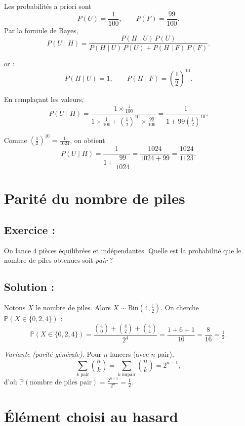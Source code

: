 Les probabilités a priori sont
\[
P(U) = \frac{1}{100}, \qquad
P(F) = \frac{99}{100}.
\]
Par la formule de Bayes,
\[
P(U \mid H)
= \frac{P(H \mid U)\,P(U)}
       {P(H \mid U)\,P(U) + P(H \mid F)\,P(F)}.
\]


or  :
\[
P(H \mid U) = 1,
\qquad
P(H \mid F) = \left(\frac{1}{2}\right)^{10}.
\]


En remplaçant les valeurs,
\[
P(U \mid H)
= \frac{1 \times \tfrac{1}{100}}
       {1 \times \tfrac{1}{100} + \left(\tfrac{1}{2}\right)^{10} \times \tfrac{99}{100}}
= \frac{1}{1 + 99\left(\tfrac{1}{2}\right)^{10}}.
\]

Comme $\left(\tfrac{1}{2}\right)^{10} = \tfrac{1}{1024}$, on obtient
\[
P(U \mid H)
= \frac{1}{1 + \dfrac{99}{1024}}
= \frac{1024}{1024 + 99}
= \boxed{\dfrac{1024}{1123}}.
\]


\section{Parité du nombre de piles}

\subsection*{Exercice :}

\begin{exerciseBox}
On lance $4$ pièces équilibrées et indépendantes. Quelle est la probabilité que le nombre de piles obtenues soit \emph{pair} ?
\end{exerciseBox}

\subsection*{Solution :}

Notons $X$ le nombre de piles. Alors $X \sim \mathrm{Bin}(4,\tfrac12)$.
On cherche $\mathbb{P}(X \in \{0,2,4\})$ :
\[
\mathbb{P}(X \in \{0,2,4\})
= \frac{\binom{4}{0} + \binom{4}{2} + \binom{4}{4}}{2^4}
= \frac{1+6+1}{16}
= \frac{8}{16}
= \boxed{\tfrac12}.
\]

\medskip
\textit{Variante (parité générale).} Pour $n$ lancers (avec $n$ pair),
\[
\sum_{k \text{ pair}} \binom{n}{k}
= \sum_{k \text{ impair}} \binom{n}{k}
= 2^{n-1},
\]
d’où $\mathbb{P}(\text{nombre de piles pair})=\frac{2^{n-1}}{2^n}=\tfrac12$.



\section{Élément choisi au hasard}

